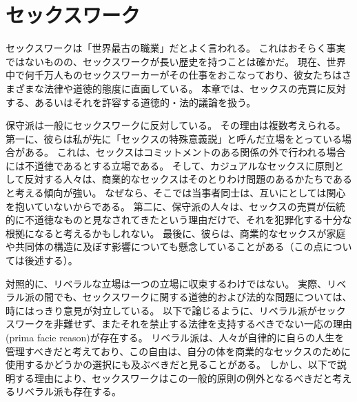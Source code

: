 \documentclass[paper=a4,book,openany]{jlreq}
\begin{document}
\section{セックスワーク}

セックスワークは「世界最古の職業」だとよく言われる。
これはおそらく事実ではないものの、セックスワークが長い歴史を持つことは確かだ。
現在、世界中で何千万人ものセックスワーカーがその仕事をおこなっており、彼女たちはさまざまな法律や道徳的態度に直面している。
本章では、セックスの売買に反対する、あるいはそれを許容する道徳的・法的議論を扱う。

保守派は一般にセックスワークに反対している。
その理由は複数考えられる。
第一に、彼らは私が先に「セックスの特殊意義説」と呼んだ立場をとっている場合がある。
これは、セックスはコミットメントのある関係の外で行われる場合には不道徳であるとする立場である。
そして、カジュアルなセックスに原則として反対する人々は、商業的なセックスはそのとりわけ問題のあるかたちであると考える傾向が強い。
なぜなら、そこでは当事者同士は、互いにとしては関心を抱いていないからである。
第二に、保守派の人々は、セックスの売買が伝統的に不道徳なものと見なされてきたという理由だけで、それを犯罪化する十分な根拠になると考えるかもしれない。
最後に、彼らは、商業的なセックスが家庭や共同体の構造に及ぼす影響についても懸念していることがある（この点については後述する）。

対照的に、リベラルな立場は一つの立場に収束するわけではない。
実際、リベラル派の間でも、セックスワークに関する道徳的および法的な問題については、時にはっきり意見が対立している。
以下で論じるように、リベラル派がセックスワークを非難せず、またそれを禁止する法律を支持するべきでない一応の理由(prima facie reason)が存在する。
リベラル派は、人々が自律的に自らの人生を管理すべきだと考えており、この自由は、自分の体を商業的なセックスのために使用するかどうかの選択にも及ぶべきだと見ることがある。
しかし、以下で説明する理由により、セックスワークはこの一般的原則の例外となるべきだと考えるリベラル派も存在する。
\end{document}
